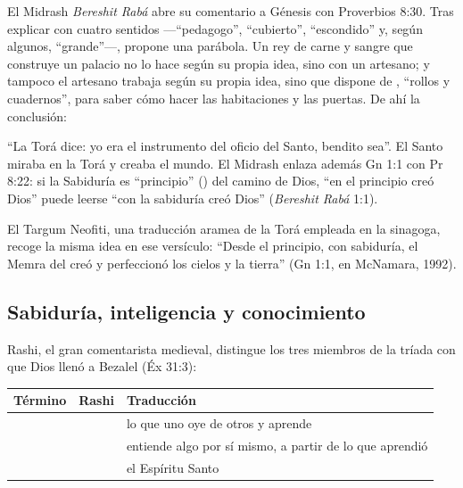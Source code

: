 El Midrash \emph{Bereshit Rabá} abre su comentario a Génesis con Proverbios 8:30. Tras explicar  con cuatro sentidos ---``pedagogo'', ``cubierto'', ``escondido'' y, según algunos, ``grande''---, propone una parábola. Un rey de carne y sangre que construye un palacio no lo hace según su propia idea, sino con un artesano; y tampoco el artesano trabaja según su propia idea, sino que dispone de , ``rollos y cuadernos'', para saber cómo hacer las habitaciones y las puertas. De ahí la conclusión:


``La Torá dice: yo era el instrumento del oficio del Santo, bendito sea''. El Santo miraba en la Torá y creaba el mundo. El Midrash enlaza además Gn 1:1 con Pr 8:22: si la Sabiduría es ``principio'' () del camino de Dios, ``en el principio creó Dios'' puede leerse ``con la sabiduría creó Dios'' (\emph{Bereshit Rabá} 1:1).

El Targum Neofiti, una traducción aramea de la Torá empleada en la sinagoga, recoge la misma idea en ese versículo: ``Desde el principio, con sabiduría, el Memra del \SENOR{} creó y perfeccionó los cielos y la tierra'' (Gn 1:1, en McNamara, 1992).


\subsection{Sabiduría, inteligencia y conocimiento}

Rashi, el gran comentarista medieval, distingue los tres miembros de la tríada con que Dios llenó a Bezalel (Éx 31:3):

\begin{center}\small\renewcommand{\arraystretch}{1.3}
\begin{tabular}{@{}L{2.4cm}L{6.2cm}L{5.8cm}@{}}
\toprule
\textbf{Término} & \textbf{Rashi} & \textbf{Traducción} \\ \midrule
{} &  & lo que uno oye de otros y aprende \\
 &  & entiende algo por sí mismo, a partir de lo que aprendió \\
 &  & el Espíritu Santo \\
\bottomrule
\end{tabular}\end{center}

